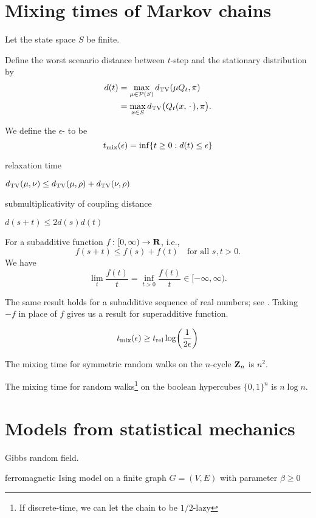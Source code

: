 \section{Mixing times of Markov chains}
Let the state space $S$ be finite.

Define the worst scenario distance between $t$-step and the stationary distribution by \begin{align*}
    d(t) & = \max_{\mu \in \mathcal P(S)} d_{\mathrm{TV}}(\mu Q_t,\pi)\\
    & = \max_{x \in S}d_{\mathrm{TV}}\bigl(Q_t(x,\,\cdot\,),\pi\bigr).
\end{align*}

We define the $\epsilon$- to be \[
    t_{\mathrm{mix}}(\epsilon) = \inf\{t \geq 0 : d(t) \leq \epsilon\}
\]

relaxation time

$d_{\mathrm{TV}}(\mu,\nu) \leq d_{\mathrm{TV}}(\mu,\rho) + d_{\mathrm{TV}}(\nu,\rho)$

submultiplicativity of coupling distance
\begin{thm}
    $d(s+t) \leq 2d(s)d(t)$
\end{thm}

\begin{namedthm}
    For a subadditive function $f\colon [0,\infty) \to \mathbf{R}$, i.e., \[
        f(s+t) \leq f(s) + f(t)\quad\text{for all }s,t>0.
    \] We have \[
        \lim_t \frac{f(t)}{t} = \inf_{t > 0} \frac{f(t)}{t} \in [-\infty,\infty).
    \]
    
    The same result holds for a subadditive sequence of real numbers; see \cite[Lemma~25.19]{Kallenberg_2021}. Taking $-f$ in place of $f$ gives us a result for superadditive function.
\end{namedthm}

\[t_{\mathrm{mix}}(\epsilon) \geq t_{\mathrm{rel}} \log\biggl(\frac{1}{2\epsilon}\biggr)\]

The mixing time for symmetric random walks on the $n$-cycle $\mathbf{Z}_n$ is $n^2$.

The mixing time for random walks\footnote{If discrete-time, we can let the chain to be $1/2$-lazy} on the boolean hypercubes $\{0,1\}^n$ is $n\log n$.

\section{Models from statistical mechanics}

Gibbs random field. 

ferromagnetic Ising model on a finite graph $G=(V,E)$ with parameter $\beta \geq 0$

